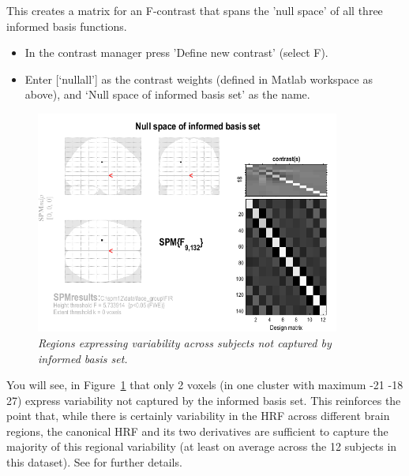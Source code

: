 \documentclass[a4paper,titlepage]{book}
\newcommand{\bi}{\begin{itemize}}
\newcommand{\ei}{\end{itemize}}
\begin{document}
This creates a matrix for an F-contrast that spans the 'null space' of all three informed basis functions.
\bi
\item{In the contrast manager press 'Define new contrast' (select F).}
\item{Enter [`nullall'] as the contrast weights (defined in Matlab workspace
	as above), and `Null space of informed basis set' as the name.}
\ei
\begin{figure}
\begin{center}
\includegraphics[width=100mm]{faces_group/nullall}
\caption{\em Regions expressing variability across subjects not captured by informed basis set. \label{nullall}}
\end{center}
\end{figure}
You will see, in Figure~\ref{nullall} that only 2 voxels (in one cluster with maximum -21 -18 27) express variability not captured by the informed basis set. This reinforces the point that, while there is certainly variability in the HRF across different brain regions, the canonical HRF and its two derivatives are sufficient to capture the majority of this regional variability (at least on average across the 12 subjects in this dataset). See \cite{rnah_basis} for further details.
\end{document}
